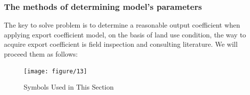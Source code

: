 \documentclass[12pt,a4paper]{article}
\begin{document}
\subsubsection{The methods of determining model's parameters}
The key to solve problem is to determine a reasonable output coefficient when applying export coefficient model, on the basis of land use condition, the way to acquire export coefficient is field inspection and consulting literature. We will proceed them as follows:

\begin{figure}[H]
\centering
\texttt{[image: figure/13]}
\caption{\footnotesize {Symbols Used in This Section}}
\end{figure}

\vspace{-1cm}


\end{document}
